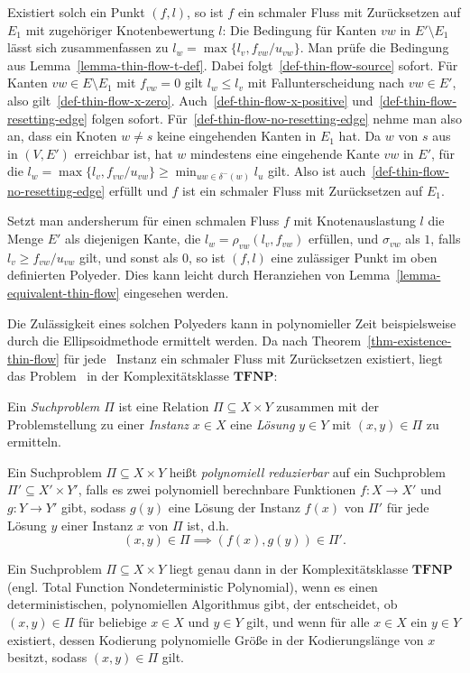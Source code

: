 Existiert solch ein Punkt $(f, l)$, so ist $f$ ein schmaler Fluss mit Zurücksetzen auf $E_1$ mit zugehöriger Knotenbewertung $l$:
Die Bedingung für Kanten $vw$ in $E'\setminus E_1$ lässt sich zusammenfassen zu $l_w = \max \{ l_v, f_{vw}/u_{vw} \}$.
Man prüfe die Bedingung aus Lemma~\ref{lemma-thin-flow-t-def}.
Dabei folgt~\ref{def-thin-flow-source} sofort.
Für Kanten $vw\in E\setminus E_1$ mit $f_{vw} = 0$ gilt $l_w \leq l_v$ mit Fallunterscheidung nach $vw\in E'$, also gilt~\ref{def-thin-flow-x-zero}.
Auch~\ref{def-thin-flow-x-positive} und~\ref{def-thin-flow-resetting-edge} folgen sofort.
Für~\ref{def-thin-flow-no-resetting-edge} nehme man also an, dass ein Knoten $w\neq s$ keine eingehenden Kanten in $E_1$ hat.
Da $w$ von $s$ aus in $(V, E')$ erreichbar ist, hat $w$ mindestens eine eingehende Kante $vw$ in $E'$, für die $l_w = \max\{ l_v, f_{vw}/u_{vw} \} \geq \min_{uw\in\delta^-(w)} l_u$ gilt.
Also ist auch~\ref{def-thin-flow-no-resetting-edge} erfüllt und $f$ ist ein schmaler Fluss mit Zurücksetzen auf $E_1$.

Setzt man andersherum für einen schmalen Fluss $f$ mit Knotenauslastung $l$ die Menge $E'$ als diejenigen Kante, die $l_w = \rho_{vw}(l_v, f_{vw})$ erfüllen, und $\sigma_{vw}$ als $1$, falls $l_v \geq f_{vw}/u_{vw}$ gilt, und sonst als $0$, so ist $(f, l)$ eine zulässiger Punkt im oben definierten Polyeder.
Dies kann leicht durch Heranziehen von Lemma~\ref{lemma-equivalent-thin-flow} eingesehen werden.

\newcommand{\TFNP}{\mathbf{TFNP}}

Die Zulässigkeit eines solchen Polyeders kann in polynomieller Zeit beispielsweise durch die Ellipsoidmethode  ermittelt werden.
Da nach Theorem~\ref{thm-existence-thin-flow} für jede \problemThinFlow\ Instanz ein schmaler Fluss mit Zurücksetzen existiert, liegt das Problem \probTFwR\ in der Komplexitätsklasse $\TFNP$:

\begin{definition}[Suchproblem]
	Ein \emph{Suchproblem $\Pi$} ist eine Relation $\Pi\subseteq X \times Y$ zusammen mit der Problemstellung zu einer \emph{Instanz} $x\in X$ eine \emph{Lösung} $y\in Y$ mit $(x,y)\in \Pi$ zu ermitteln.
	
	Ein Suchproblem $\Pi\subseteq X\times Y$ heißt \emph{polynomiell reduzierbar} auf ein Suchproblem $\Pi'\subseteq X'\times Y'$, falls es zwei polynomiell berechnbare Funktionen $f: X\rightarrow X'$ und $g: Y\rightarrow Y'$ gibt, sodass $g(y)$ eine Lösung der Instanz $f(x)$ von $\Pi'$ für jede Lösung $y$ einer Instanz $x$ von $\Pi$ ist, d.h.
	\[ (x,y) \in \Pi \implies (f(x), g(y)) \in \Pi'.\]
\end{definition}
\begin{definition}[Komplexitätsklasse $\TFNP$]
	Ein Suchproblem $\Pi\subseteq X \times Y$ liegt genau dann in der Komplexitätsklasse $\TFNP$ (engl. Total Function Nondeterministic Polynomial), wenn es einen deterministischen, polynomiellen Algorithmus gibt, der entscheidet, ob $(x,y) \in \Pi$ für beliebige $x\in X$ und $y\in Y$ gilt, und wenn für alle $x\in X$ ein $y\in Y$ existiert, dessen Kodierung polynomielle Größe in der Kodierungslänge von $x$ besitzt, sodass $(x, y) \in \Pi$ gilt.
\end{definition}

